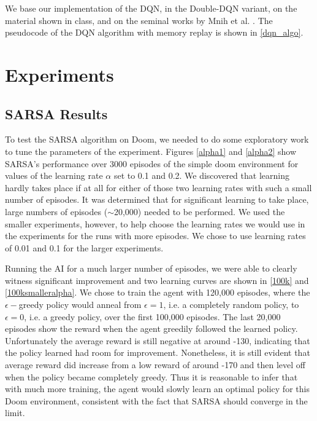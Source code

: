 \documentclass[letterpaper]{article} %
\begin{document}
We base our implementation of the DQN, in the Double-DQN variant\cite{van2016deep}, on the material shown in class, and on the seminal works by Mnih et al. \cite{playing_atari} \cite{mnih2015human}. The pseudocode of the DQN algorithm with memory replay is shown in \cref{dqn_algo}.



\section{Experiments}

\subsection{SARSA Results}
To test the SARSA algorithm on Doom, we needed to do some exploratory work to tune the parameters of the experiment. Figures \ref{alpha1} and \ref{alpha2} show SARSA's performance over 3000 episodes of the simple doom environment for values of the learning rate $\alpha$ set to 0.1 and 0.2. We discovered that learning hardly takes place if at all for either of those two learning rates with such a small number of episodes. It was determined that for significant learning to take place, large numbers of episodes ($\sim $20,000) needed to be performed. We used the smaller experiments, however, to help choose the learning rates we would use in the experiments for the runs with more episodes. We chose to use learning rates of 0.01 and 0.1 for the larger experiments. 

Running the AI for a much larger number of episodes, we were able to clearly witness significant improvement and two learning curves are shown in \cref{100k} and \cref{100ksmalleralpha}. We chose to train the agent with 120,000 episodes, where the $\epsilon-$greedy policy would anneal from $\epsilon = 1$, i.e. a completely random policy, to $\epsilon=0$, i.e. a greedy policy, over the first 100,000 episodes. The last 20,000 episodes show the reward when the agent greedily followed the learned policy. Unfortunately the average reward is still negative at around -130, indicating that the policy learned had room for improvement. Nonetheless, it is still evident that average reward did increase from a low reward of around -170 and then level off when the policy became completely greedy. Thus it is reasonable to infer that with much more training, the agent would slowly learn an optimal policy for this Doom environment, consistent with the fact that SARSA should converge in the limit.
\end{document}
